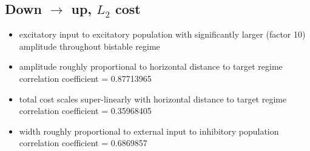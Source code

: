 \documentclass[]{article}
\begin{document}
\subsection{Down $\rightarrow$ up, $L_2$ cost}

\begin{minipage}{0.65\textwidth}
	\begin{itemize}
		\item excitatory input to excitatory population with significantly larger (factor 10) amplitude throughout bistable regime
		\item amplitude roughly proportional to horizontal distance to target regime\\
		correlation coefficient = 0.87713965
		\item total cost scales super-linearly with horizontal distance to target regime\\
		correlation coefficient = 0.35968405
		\item width roughly proportional to external input to inhibitory population\\
		correlation coefficient = 0.6869857
	\end{itemize}
\end{minipage}
\end{document}
